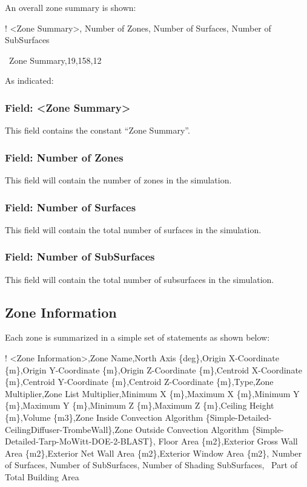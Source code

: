 An overall zone summary is shown:

! \textless{}Zone Summary\textgreater{}, Number of Zones, Number of Surfaces, Number of SubSurfaces

~Zone Summary,19,158,12

As indicated:

\subsubsection{Field: \textless{}Zone Summary\textgreater{}}\label{field-zone-summary}

This field contains the constant ``Zone Summary''.

\subsubsection{Field: Number of Zones}\label{field-number-of-zones}

This field will contain the number of zones in the simulation.

\subsubsection{Field: Number of Surfaces}\label{field-number-of-surfaces}

This field will contain the total number of surfaces in the simulation.

\subsubsection{Field: Number of SubSurfaces}\label{field-number-of-subsurfaces}

This field will contain the total number of subsurfaces in the simulation.

\subsection{Zone Information}\label{zone-information}

Each zone is summarized in a simple set of statements as shown below:

! \textless{}Zone Information\textgreater{},Zone Name,North Axis \{deg\},Origin X-Coordinate \{m\},Origin Y-Coordinate \{m\},Origin Z-Coordinate \{m\},Centroid X-Coordinate \{m\},Centroid Y-Coordinate \{m\},Centroid Z-Coordinate \{m\},Type,Zone Multiplier,Zone List Multiplier,Minimum X \{m\},Maximum X \{m\},Minimum Y \{m\},Maximum Y \{m\},Minimum Z \{m\},Maximum Z \{m\},Ceiling Height \{m\},Volume \{m3\},Zone Inside Convection Algorithm \{Simple-Detailed-CeilingDiffuser-TrombeWall\},Zone Outside Convection Algorithm \{Simple-Detailed-Tarp-MoWitt-DOE-2-BLAST\}, Floor Area \{m2\},Exterior Gross Wall Area \{m2\},Exterior Net Wall Area \{m2\},Exterior Window Area \{m2\}, Number of Surfaces, Number of SubSurfaces, Number of Shading SubSurfaces,~ Part of Total Building Area

